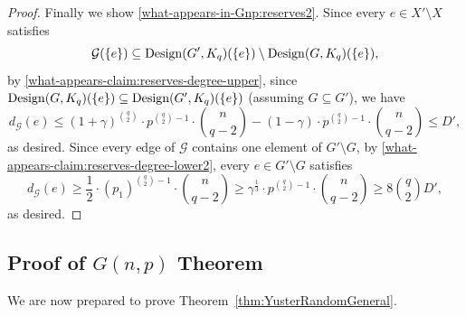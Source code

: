 \documentclass[11pt]{article}
\def\COMMENT#1{}
\numberwithin{equation}{section}
\newcounter{i}
\theoremstyle{plain}
\theoremstyle{plain} %
\theoremstyle{definition}
\newcommand{\cG}{\mathcal{G}}
\begin{document}
\begin{proof}
Finally we show \ref{what-appears-in-Gnp:reserves2}.  
Since every $e \in X' \setminus X$ satisfies\COMMENT{Note that $\cG(\{e\})$ is the set of $S \cong K_q$ containing $e$ with one edge in $G' \setminus G$ and the rest in $X' \setminus X$, while ${\rm Design}(G', K_q)(\{e\})$ is the set of $S \cong K_q$ containing $e$ such that $S\subseteq G'$ and ${\rm Design}(G, K_q)(\{e\})$ is the set of $S \cong K_q$ containing $e$ such that $S\subseteq G$, so (assuming $G \subseteq G'$ and thus $X' \subseteq G'$) every such $S \in \cG(\{e\})$ is in the former but not the latter.}
\begin{equation*}
    \cG(\{e\}) \subseteq {\rm Design}(G', K_q)(\{e\}) \setminus {\rm Design}(G, K_q)(\{e\}),
\end{equation*}
by \ref{what-appears-claim:reserves-degree-upper}, since ${\rm Design}(G, K_q)(\{e\}) \subseteq {\rm Design}(G', K_q)(\{e\})$  (assuming $G \subseteq G'$), we have 
\begin{equation*}
    d_{\cG}(e) \leq (1 + \gamma)^{\binom{q}{2}}\cdot p^{\binom{q}{2}-1}\cdot \binom{n}{q-2} - (1 - \gamma)\cdot p^{\binom{q}{2}-1}\cdot \binom{n}{q - 2} \leq D',
\end{equation*}
as desired.
Since every edge of $\cG$ contains one element of $G' \setminus G$, by \ref{what-appears-claim:reserves-degree-lower2}, every $e \in G' \setminus G$ satisfies
\begin{equation*}
    d_{\cG}(e) \geq \frac{1}{2}\cdot (p_1)^{\binom{q}{2}-1}\cdot\binom{n}{q - 2} \geq \gamma^{\frac{1}{3}}\cdot p^{\binom{q}{2}-1}\cdot\binom{n}{q - 2} \geq 8\binom{q}{2}D',
\end{equation*}
as desired.
\end{proof}


\subsection{Proof of $G(n,p)$ Theorem}

We are now prepared to prove Theorem~\ref{thm:YusterRandomGeneral}.
\end{document}
